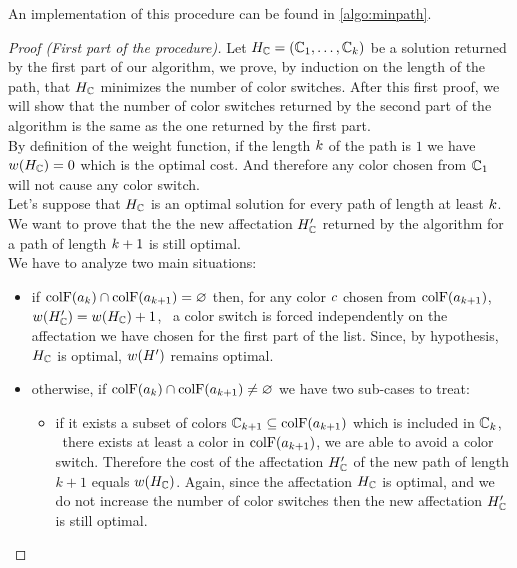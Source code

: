 An implementation of this procedure can be found in \cref{algo:minpath}.


\begin{proof}[Proof (First part of the procedure)]
  Let $H_{\mathbb{C}} = (\mathbb{C}_1,\ldots,\mathbb{C}_{k})$ be a solution returned by the first part of our algorithm, we prove, by induction on the length of the path, that $H_{\mathbb{C}}$ minimizes the number of color switches. After this first proof, we will show that the number of color switches returned by the second part of the algorithm is the same as the one returned by the first part. \\
  By definition of the weight function, if the length $k$ of the path is $1$ we have $w(H_{\mathbb{C}}) = 0$ which is the optimal cost. And therefore any color chosen from $\mathbb{C}_1$ will not cause any color switch.\\
  Let's suppose that $H_{\mathbb{C}}$ is an optimal solution for every path of length at least $k$. We want to prove that the the new affectation $H_{\mathbb{C}}'$ returned by the algorithm for a path of length $k+1$ is still optimal. \\
  We have to analyze two main situations:

  \begin{itemize}
    \item if $\text{colF}(a_k) \cap \text{colF}(a_{k+1}) = \varnothing$ then, for any color $c$ chosen from $\text{colF}(a_{k+1})$, $w(H_{\mathbb{C}}') = w(H_{\mathbb{C}}) + 1$, \ie\ a color switch is forced independently on the affectation we have chosen for the first part of the list. Since, by hypothesis, $H_{\mathbb{C}}$ is optimal, $w(H')$ remains optimal.
    \item otherwise, if $\text{colF}(a_k) \cap \text{colF}(a_{k+1}) \neq \varnothing$ we have two sub-cases to treat:
          \begin{itemize}

            \item if it exists a subset of colors $\mathbb{C}_{k+1} \subseteq \text{colF}(a_{k+1})$ which is included in $\mathbb{C}_k$, \ie\ there exists at least a color in $\text{colF}(a_{k+1})$, we are able to avoid a color switch. Therefore the cost of the affectation $H_{\mathbb{C}}'$ of the new path of length $k+1$ equals $w(H_{\mathbb{C}})$. Again, since the affectation $H_{\mathbb{C}}$ is optimal, and we do not increase the number of color switches then the new affectation $H_{\mathbb{C}}'$ is still optimal.


\end{itemize}
\end{itemize}
\end{proof}
